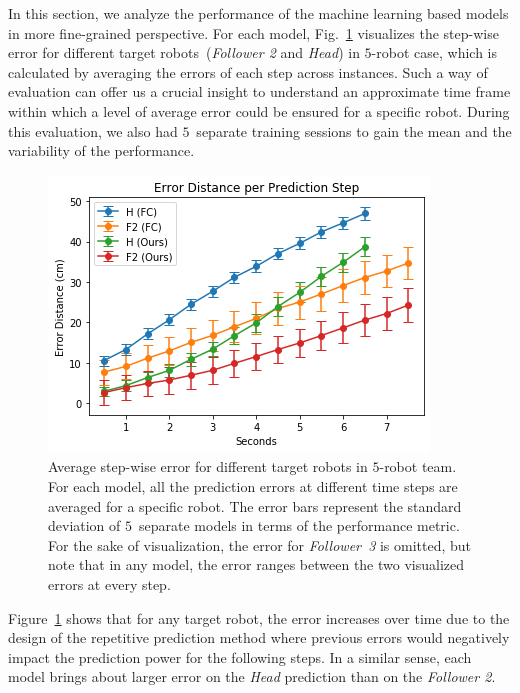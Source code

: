 \documentclass[letterpaper, 10 pt, conference]{ieeeconf}  %
\begin{document}
    In this section, we analyze the performance of the machine learning
    based models in more fine-grained perspective. For each model,
    Fig.~\ref{fig:micro_eval} visualizes the step-wise error for
    different target robots~(\emph{Follower 2} and \emph{Head}) in
    $5$-robot case, which is calculated by averaging the errors of each
    step across instances. Such a way of evaluation can offer us a
    crucial insight to understand an approximate time frame within which
    a level of average error could be ensured for a specific robot.
    During this evaluation, we also had $5$~separate training sessions
    to gain the mean and the variability of the performance.
	\begin{figure}[t]
		\centering
		\includegraphics[width=1.\columnwidth]{fig_micro_eval}
		\caption{Average step-wise error for different target robots in $5$-robot team.
			For each model, all the prediction errors at different time steps are averaged
			for a specific robot. The error bars represent the standard deviation of
			$5$~separate models in terms of the performance metric. For the sake of
			visualization, the error for \emph{Follower~3} is omitted, but note that
			in any model, the error ranges between the two visualized errors at every step.
		}
		\label{fig:micro_eval}
	\end{figure}

    Figure~\ref{fig:micro_eval} shows that for any target robot, the
    error increases over time due to the design of the repetitive
    prediction method where previous errors would negatively impact the
    prediction power for the following steps. In a similar sense, each
    model brings about larger error on the \emph{Head} prediction than
    on the \emph{Follower 2}.
\end{document}
